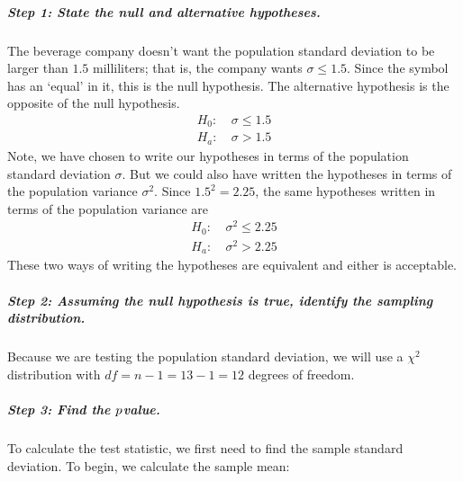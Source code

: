 \documentclass[letterpaper,10pt,english]{jupyterBook}
\begin{document}
\subparagraph{Step 1: State the null and alternative hypotheses.}
\label{\detokenize{Ch7 The Chi-Square Distribution/7.2 Hypothesis Testing for the Population Variance:step-1-state-the-null-and-alternative-hypotheses}}
\sphinxAtStartPar
The beverage company doesn’t want the population standard deviation to be larger than \(1.5\) milliliters; that is, the company wants \(\sigma \leq 1.5\). Since the symbol has an ‘equal’ in it, this is the null hypothesis. The alternative hypothesis is the opposite of the null hypothesis.
\begin{align*}
H_0:&\ \sigma \leq 1.5 \\
H_a:&\ \sigma > 1.5
\end{align*}
\sphinxAtStartPar
Note, we have chosen to write our hypotheses in terms of the population standard deviation \(\sigma\). But we could also have written the hypotheses in terms of the population variance \(\sigma^2\). Since \(1.5^2 = 2.25\), the same hypotheses written in terms of the population variance are
\begin{align*}
H_0:&\ \sigma^2 \leq 2.25 \\
H_a:&\ \sigma^2 > 2.25
\end{align*}
\sphinxAtStartPar
These two ways of writing the hypotheses are equivalent and either is acceptable.


\subparagraph{Step 2: Assuming the null hypothesis is true, identify the sampling distribution.}
\label{\detokenize{Ch7 The Chi-Square Distribution/7.2 Hypothesis Testing for the Population Variance:step-2-assuming-the-null-hypothesis-is-true-identify-the-sampling-distribution}}
\sphinxAtStartPar
Because we are testing the population standard deviation, we will use a \(\chi^2\) distribution with \(df = n - 1 = 13 - 1 = 12\) degrees of freedom.


\subparagraph{Step 3: Find the \protect\(p\protect\)\sphinxhyphen{}value.}
\label{\detokenize{Ch7 The Chi-Square Distribution/7.2 Hypothesis Testing for the Population Variance:step-3-find-the-p-value}}
\sphinxAtStartPar
To calculate the test statistic, we first need to find the sample standard deviation. To begin, we calculate the sample mean:
\end{document}
